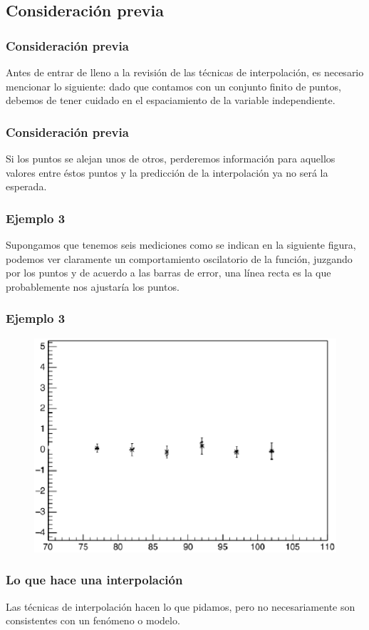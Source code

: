 \documentclass[12pt]{beamer}
\begin{document}
\subsection{Consideración previa}

\begin{frame}
\frametitle{Consideración previa}
Antes de entrar de lleno a la revisión de las técnicas de interpolación, es necesario mencionar lo siguiente: dado que contamos con un conjunto finito de puntos, debemos de tener cuidado en el espaciamiento de la variable independiente.
\end{frame}
\begin{frame}
\frametitle{Consideración previa}
Si los puntos se alejan unos de otros, perderemos información para aquellos valores entre éstos puntos y la predicción de la interpolación ya no será la esperada.
\end{frame}
\begin{frame}
\frametitle{Ejemplo 3}
Supongamos que tenemos seis mediciones como se indican en la siguiente figura, podemos ver claramente un comportamiento oscilatorio de la función, juzgando por los puntos y de acuerdo a las barras de error, una línea recta es la que probablemente nos ajustaría los puntos.
\end{frame}
\begin{frame}
\frametitle{Ejemplo 3}
\vspace*{-0.25cm}
\begin{figure}
	\centering
	\includegraphics[scale=0.55]{Imagenes/figura01-1.eps} 
\end{figure}
\end{frame}
\begin{frame}
\frametitle{Lo que hace una interpolación}
Las técnicas de interpolación hacen lo que pidamos, pero no necesariamente son consistentes con un fenómeno o modelo.
\end{frame}
\end{document}
